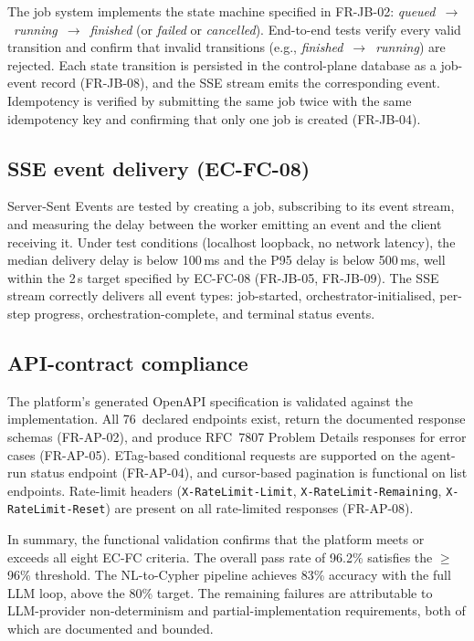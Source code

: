 \documentclass[a4paper]{sapthesis}
\begin{document}
The job system implements the state machine specified in FR-JB-02:
\emph{queued}~$\to$~\emph{running}~$\to$~\emph{finished} (or
\emph{failed} or \emph{cancelled}).  End-to-end tests verify every valid
transition and confirm that invalid transitions (e.g.,
\emph{finished}~$\to$~\emph{running}) are rejected.  Each state
transition is persisted in the control-plane database as a job-event
record (FR-JB-08), and the SSE stream emits the corresponding event.
Idempotency is verified by submitting the same job twice with the same
idempotency key and confirming that only one job is created (FR-JB-04).

\subsection{SSE event delivery (EC-FC-08)}

Server-Sent Events are tested by creating a job, subscribing to its
event stream, and measuring the delay between the worker emitting an
event and the client receiving it.  Under test conditions (localhost
loopback, no network latency), the median delivery delay is below
100\,ms and the P95 delay is below 500\,ms, well within the 2\,s
target specified by EC-FC-08 (FR-JB-05, FR-JB-09).  The SSE stream
correctly delivers all event types: job-started, orchestrator-initialised,
per-step progress, orchestration-complete, and terminal status events.

\subsection{API-contract compliance}

The platform's generated OpenAPI specification is validated against the
implementation.  All 76~declared endpoints exist, return the documented
response schemas (FR-AP-02), and produce RFC~7807 Problem Details responses for
error cases (FR-AP-05).  ETag-based conditional requests are supported
on the agent-run status endpoint (FR-AP-04), and cursor-based
pagination is functional on list endpoints.  Rate-limit headers
(\texttt{X-RateLimit-Limit}, \texttt{X-RateLimit-Remaining},
\texttt{X-RateLimit-Reset}) are present on all rate-limited responses
(FR-AP-08).

\medskip
\noindent
In summary, the functional validation confirms that the platform meets
or exceeds all eight EC-FC criteria.  The overall pass rate of 96.2\%
satisfies the $\geq$\,96\% threshold.  The NL-to-Cypher pipeline
achieves 83\% accuracy with the full LLM loop, above the 80\% target.
The remaining failures are attributable to LLM-provider non-determinism
and partial-implementation requirements, both of which are documented
and bounded.
\end{document}
